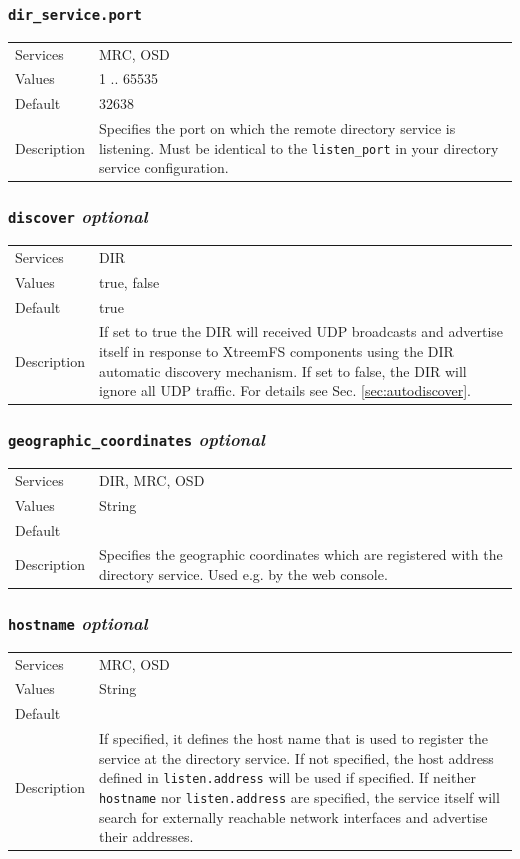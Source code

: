 \documentclass[a4paper,10pt]{book}
\begin{document}
\subsubsection{\texttt{dir\_service.port}}
\begin{tabular}{lp{10cm}}
 Services & MRC, OSD\\
 Values   & 1 .. 65535 \\
 Default  & 32638 \\
 Description & Specifies the port on which the remote directory service is listening. Must be identical to the \texttt{listen\_port} in your directory service configuration.
\end{tabular}

\subsubsection{\texttt{discover} \textit{optional}}
\begin{tabular}{lp{10cm}}
 Services & DIR\\
 Values   & true, false \\
 Default  & true \\
 Description & If set to true the DIR will received UDP broadcasts and advertise itself in response to XtreemFS components using the DIR automatic discovery mechanism. If set to false, the DIR will ignore all UDP traffic. For details see Sec. \ref{sec:autodiscover}.
\end{tabular}

\subsubsection{\texttt{geographic\_coordinates} \textit{optional}}
\begin{tabular}{lp{10cm}}
 Services & DIR, MRC, OSD\\
 Values   & String \\
 Default  & \\
 Description & Specifies the geographic coordinates which are registered with the directory service. Used e.g. by the web console.
\end{tabular}

\subsubsection{\texttt{hostname} \textit{optional}}
\begin{tabular}{lp{10cm}}
 Services & MRC, OSD\\
 Values   & String \\
 Default  & \\
 Description & If specified, it defines the host name that is used to register the service at the directory service. If not specified, the host address defined in \texttt{listen.address} will be used if specified. If neither \texttt{hostname} nor \texttt{listen.address} are specified, the service itself will search for externally reachable network interfaces and advertise their addresses.
\end{tabular}
\end{document}
